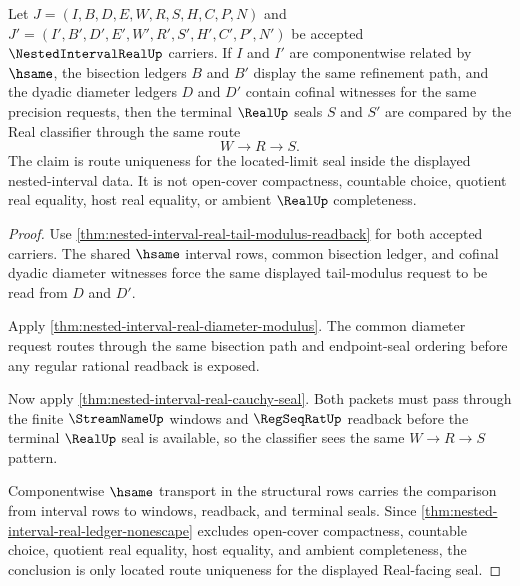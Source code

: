 \begin{theorem}
\label{thm:nested-interval-real-located-limit-uniqueness}
Let $J=(I,B,D,E,W,R,S,H,C,P,N)$ and $J'=(I',B',D',E',W',R',S',H',C',P',N')$ be accepted $\NestedIntervalRealUp$ carriers. If $I$ and $I'$ are componentwise related by $\hsame$, the bisection ledgers $B$ and $B'$ display the same refinement path, and the dyadic diameter ledgers $D$ and $D'$ contain cofinal witnesses for the same precision requests, then the terminal $\RealUp$ seals $S$ and $S'$ are compared by the Real classifier through the same route
$$
W \longrightarrow R \longrightarrow S .
$$
The claim is route uniqueness for the located-limit seal inside the displayed nested-interval data. It is not open-cover compactness, countable choice, quotient real equality, host real equality, or ambient $\RealUp$ completeness.
\end{theorem}
\begin{proof}
Use \autoref{thm:nested-interval-real-tail-modulus-readback} for both accepted carriers. The shared $\hsame$ interval rows, common bisection ledger, and cofinal dyadic diameter witnesses force the same displayed tail-modulus request to be read from $D$ and $D'$.

Apply \autoref{thm:nested-interval-real-diameter-modulus}. The common diameter request routes through the same bisection path and endpoint-seal ordering before any regular rational readback is exposed.

Now apply \autoref{thm:nested-interval-real-cauchy-seal}. Both packets must pass through the finite $\StreamNameUp$ windows and $\RegSeqRatUp$ readback before the terminal $\RealUp$ seal is available, so the classifier sees the same $W \longrightarrow R \longrightarrow S$ pattern.

Componentwise $\hsame$ transport in the structural rows carries the comparison from interval rows to windows, readback, and terminal seals. Since \autoref{thm:nested-interval-real-ledger-nonescape} excludes open-cover compactness, countable choice, quotient real equality, host equality, and ambient completeness, the conclusion is only located route uniqueness for the displayed Real-facing seal.
\end{proof}

